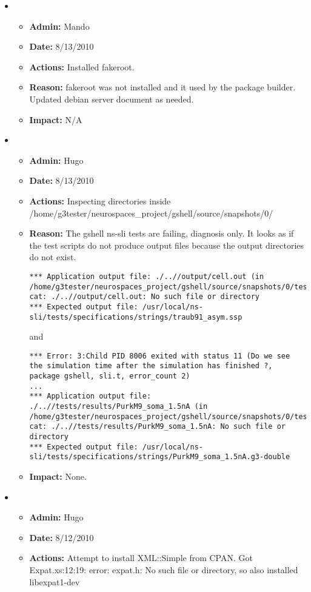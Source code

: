 \documentclass[12pt]{article}
\begin{document}
\begin{itemize}
\item 
\begin{itemize}
\item[] {\bf Admin:} Mando
\item[] {\bf Date:} 8/13/2010 
\item[] {\bf Actions:} Installed fakeroot.
\item[] {\bf Reason:} fakeroot was not installed and it used by the package builder. Updated debian server document as needed.
\item[] {\bf Impact:} N/A
\end{itemize}

	
\item 
\begin{itemize}
\item[] {\bf Admin:} Hugo
\item[] {\bf Date:} 8/13/2010 
\item[] {\bf Actions:} Inspecting directories inside
  /home/g3tester/neurospaces\_project/gshell/source/snapshots/0/
\item[] {\bf Reason:} The gshell ns-sli tests are failing, diagnosis
  only.  It looks as if the test scripts do not produce output files
  because the output directories do not exist.
\begin{verbatim}
*** Application output file: ./..//output/cell.out (in /home/g3tester/neurospaces_project/gshell/source/snapshots/0/tests)
cat: ./..//output/cell.out: No such file or directory
*** Expected output file: /usr/local/ns-sli/tests/specifications/strings/traub91_asym.ssp
\end{verbatim}
and
\begin{verbatim}
*** Error: 3:Child PID 8006 exited with status 11 (Do we see the simulation time after the simulation has finished ?, package gshell, sli.t, error_count 2)
...
*** Application output file: ./..//tests/results/PurkM9_soma_1.5nA (in /home/g3tester/neurospaces_project/gshell/source/snapshots/0/tests)
cat: ./..//tests/results/PurkM9_soma_1.5nA: No such file or directory
*** Expected output file: /usr/local/ns-sli/tests/specifications/strings/PurkM9_soma_1.5nA.g3-double
\end{verbatim}
\item[] {\bf Impact:} None.
\end{itemize}

\item 
\begin{itemize}
\item[] {\bf Admin:} Hugo
\item[] {\bf Date:} 8/12/2010 
\item[] {\bf Actions:} Attempt to install XML::Simple from CPAN.
Got Expat.xs:12:19: error: expat.h: No such file or directory, so also installed libexpat1-dev


\end{itemize}
\end{itemize}
\end{document}
